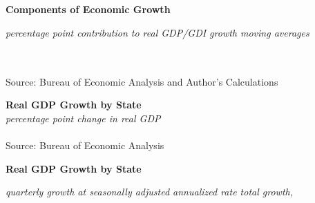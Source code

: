 \documentclass{report}
\begin{document}
\newpage

\noindent \normalsize \textbf{Components of Economic Growth}\\
\footnotesize{\textit{percentage point contribution to real GDP/GDI growth \hspace{30mm} moving averages}\\ \vspace{4mm}
\hspace*{-2mm} \noindent {} \setlength{\tabcolsep}{3.5pt} \color{black!90}
		{\renewcommand{\arraystretch}{1.55}
		 \begin{tabular}{p{2mm} p{35.2mm} R{6.8mm} R{6.8mm} R{6.8mm} R{6.8mm} R{6.8mm} p{0mm} R{6.8mm} R{6.8mm} R{6.8mm} }

		\end{tabular}}	\\
\footnotesize{Source: Bureau of Economic Analysis and Author's Calculations}
		
\newpage

\noindent \normalsize \textbf{Real GDP Growth by State}\\
\footnotesize{\textit{percentage point change in real GDP}}\\
\vspace{-2mm}
\hspace{-8mm}  \\
\footnotesize{Source: Bureau of Economic Analysis}\\

\vspace{2mm}

\begin{minipage}{0.76\textwidth}

\small  

\end{minipage}

\vspace{2mm}

\noindent \normalsize \textbf{Real GDP Growth by State}\\
\footnotesize{\textit{quarterly growth at seasonally adjusted annualized rate \hspace{20mm} total growth, }\\ 

\vspace{-4.5mm}
\hspace{-2mm} \noindent {} \setlength{\tabcolsep}{3.7pt} \color{black!90}
		{\renewcommand{\arraystretch}{1.44}
		 \begin{tabular}{p{30mm} R{7mm} R{7mm} R{7mm} R{7mm} R{7mm} p{0mm} R{9mm} R{9mm} R{10mm} }
 \hline
		\end{tabular}}	\\

}}
\end{document}
